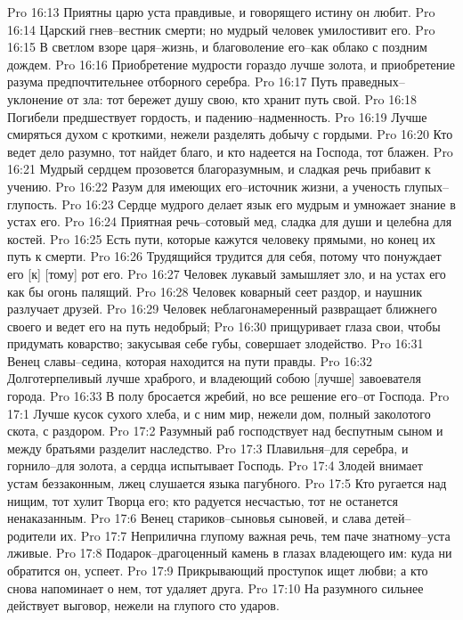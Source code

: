 Pro 16:13  Приятны царю уста правдивые, и говорящего истину он любит.
Pro 16:14  Царский гнев--вестник смерти; но мудрый человек умилостивит его.
Pro 16:15  В светлом взоре царя--жизнь, и благоволение его--как облако с поздним дождем.
Pro 16:16  Приобретение мудрости гораздо лучше золота, и приобретение разума предпочтительнее отборного серебра.
Pro 16:17  Путь праведных--уклонение от зла: тот бережет душу свою, кто хранит путь свой.
Pro 16:18  Погибели предшествует гордость, и падению--надменность.
Pro 16:19  Лучше смиряться духом с кроткими, нежели разделять добычу с гордыми.
Pro 16:20  Кто ведет дело разумно, тот найдет благо, и кто надеется на Господа, тот блажен.
Pro 16:21  Мудрый сердцем прозовется благоразумным, и сладкая речь прибавит к учению.
Pro 16:22  Разум для имеющих его--источник жизни, а ученость глупых--глупость.
Pro 16:23  Сердце мудрого делает язык его мудрым и умножает знание в устах его.
Pro 16:24  Приятная речь--сотовый мед, сладка для души и целебна для костей.
Pro 16:25  Есть пути, которые кажутся человеку прямыми, но конец их путь к смерти.
Pro 16:26  Трудящийся трудится для себя, потому что понуждает его [к] [тому] рот его.
Pro 16:27  Человек лукавый замышляет зло, и на устах его как бы огонь палящий.
Pro 16:28  Человек коварный сеет раздор, и наушник разлучает друзей.
Pro 16:29  Человек неблагонамеренный развращает ближнего своего и ведет его на путь недобрый;
Pro 16:30  прищуривает глаза свои, чтобы придумать коварство; закусывая себе губы, совершает злодейство.
Pro 16:31  Венец славы--седина, которая находится на пути правды.
Pro 16:32  Долготерпеливый лучше храброго, и владеющий собою [лучше] завоевателя города.
Pro 16:33  В полу бросается жребий, но все решение его--от Господа.
Pro 17:1  Лучше кусок сухого хлеба, и с ним мир, нежели дом, полный заколотого скота, с раздором.
Pro 17:2  Разумный раб господствует над беспутным сыном и между братьями разделит наследство.
Pro 17:3  Плавильня--для серебра, и горнило--для золота, а сердца испытывает Господь.
Pro 17:4  Злодей внимает устам беззаконным, лжец слушается языка пагубного.
Pro 17:5  Кто ругается над нищим, тот хулит Творца его; кто радуется несчастью, тот не останется ненаказанным.
Pro 17:6  Венец стариков--сыновья сыновей, и слава детей--родители их.
Pro 17:7  Неприлична глупому важная речь, тем паче знатному--уста лживые.
Pro 17:8  Подарок--драгоценный камень в глазах владеющего им: куда ни обратится он, успеет.
Pro 17:9  Прикрывающий проступок ищет любви; а кто снова напоминает о нем, тот удаляет друга.
Pro 17:10  На разумного сильнее действует выговор, нежели на глупого сто ударов.
